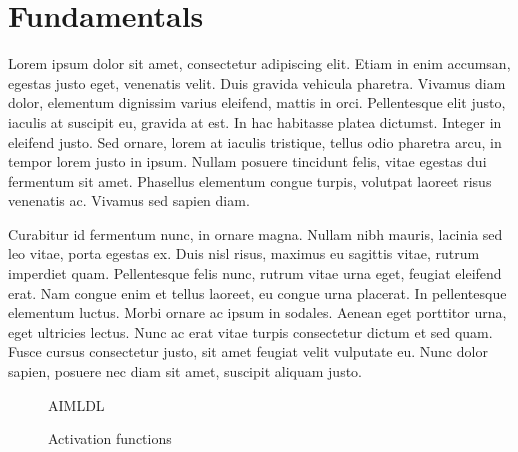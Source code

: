 \chapter{Fundamentals}
 Lorem ipsum dolor sit amet, consectetur adipiscing elit. Etiam in enim accumsan, egestas justo eget, venenatis velit. Duis gravida vehicula pharetra. Vivamus diam dolor, elementum dignissim varius eleifend, mattis in orci. Pellentesque elit justo, iaculis at suscipit eu, gravida at est. In hac habitasse platea dictumst. Integer in eleifend justo. Sed ornare, lorem at iaculis tristique, tellus odio pharetra arcu, in tempor lorem justo in ipsum. Nullam posuere tincidunt felis, vitae egestas dui fermentum sit amet. Phasellus elementum congue turpis, volutpat laoreet risus venenatis ac. Vivamus sed sapien diam.

Curabitur id fermentum nunc, in ornare magna. Nullam nibh mauris, lacinia sed leo vitae, porta egestas ex. Duis nisl risus, maximus eu sagittis vitae, rutrum imperdiet quam. Pellentesque felis nunc, rutrum vitae urna eget, feugiat eleifend erat. Nam congue enim et tellus laoreet, eu congue urna placerat. In pellentesque elementum luctus. Morbi ornare ac ipsum in sodales. Aenean eget porttitor urna, eget ultricies lectus. Nunc ac erat vitae turpis consectetur dictum et sed quam. Fusce cursus consectetur justo, sit amet feugiat velit vulputate eu. Nunc dolor sapien, posuere nec diam sit amet, suscipit aliquam justo. 
\begin{figure}[!h]
	\centering
    \def\svgwidth{0.5\textwidth}
%    
    \caption{AIMLDL}
    \label{fig:ai_ml_dl}
\end{figure}

\begin{figure}[h]
	\begin{center}
	   \def\svgwidth{0.7\textwidth}
%    
	\end{center}
    \caption{Activation functions}
    \label{fig:activationfunctions}
\end{figure}

